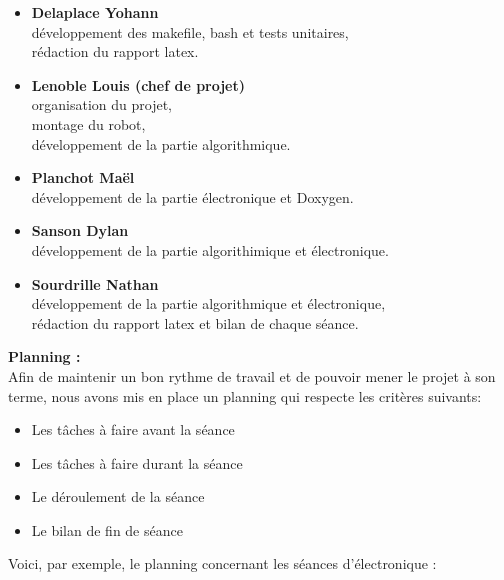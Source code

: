 \begin{itemize}
    \item \textbf{Delaplace Yohann}\\
    développement des makefile, bash et tests unitaires,\\
    rédaction du rapport latex.
    \item \textbf{Lenoble Louis (chef de projet)}\\
    organisation du projet,\\
    montage du robot,\\
    développement de la partie algorithmique.
    \item \textbf{Planchot Maël}\\
    développement de la partie électronique et Doxygen.
    \item \textbf{Sanson Dylan}\\
    développement de la partie algorithimique et électronique.
    \item \textbf{Sourdrille Nathan}\\
    développement de la partie algorithmique et électronique,\\
    rédaction du rapport latex et bilan de chaque séance.
    
\end{itemize} 
\vspace{0.5cm}

\textbf{Planning :}\\
Afin de maintenir un bon rythme de travail et de pouvoir mener le projet à son terme, nous avons mis en place un planning qui respecte les critères suivants: 
\begin{itemize}
\item {Les tâches à faire avant la séance}
\item {Les tâches à faire durant la séance}
\item {Le déroulement de la séance}
\item {Le bilan de fin de séance}
\end{itemize} 
\vspace{0.5cm}
Voici, par exemple, le planning concernant les séances d'électronique :

